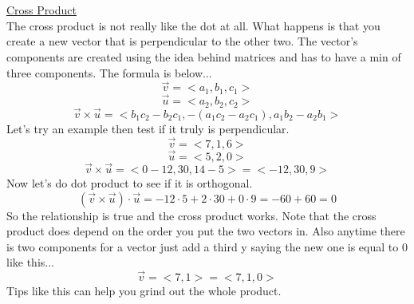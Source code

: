 \documentclass[a4paper,openright, 14pt]{article}
\begin{document}
\\\\\underline{Cross Product}\\
The cross product is not really like the dot at all. What happens is that you create a new vector that is perpendicular to the other two. The vector's components are created using the idea behind matrices and has to have a min of three components. The formula is below...
$$\overrightarrow{v}=<a_1 ,b_1, c_1>$$
$$\overrightarrow{u}=<a_2 ,b_2, c_2>$$
$$\overrightarrow{v}\times \overrightarrow{u}=<b_1 c_2-b_2 c_1,-(a_1 c_2-a_2 c_1),a_1 b_2-a_2 b_1>$$
Let's try an example then test if it truly is perpendicular. 
$$\overrightarrow{v}=< 7,1,6 >$$
$$\overrightarrow{u}=< 5,2,0 >$$
$$\overrightarrow{v}\times \overrightarrow{u}=<0-12,30,14-5>=<-12,30,9>$$
Now let's do dot product to see if it is orthogonal.
$$(\overrightarrow{v}\times \overrightarrow{u})\cdot \overrightarrow{u}=-12\cdot5+2\cdot30+0\cdot9=-60+60=0$$
So the relationship is true and the cross product works. Note that the cross product does depend on the order you put the two vectors in. Also anytime there is two components for a vector just add a third y saying the new one is equal to 0 like this...
$$\overrightarrow{v}=< 7,1>=<7,1,0>$$
Tips like this can help you grind out the whole product.
\end{document}
